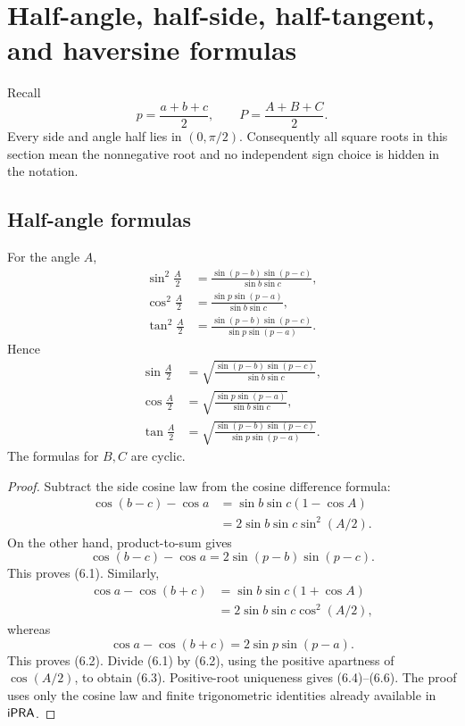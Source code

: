 \section{Half-angle, half-side, half-tangent, and haversine formulas}
\label{sec:half-formulas}

Recall
\[
 p=\frac{a+b+c}{2},\qquad P=\frac{A+B+C}{2}.
\]
Every side and angle half lies in \((0,\pi/2)\).  Consequently all square roots
in this section mean the nonnegative root and no independent sign choice is
hidden in the notation.

\subsection{Half-angle formulas}

\begin{theorem}
\label{thm:half-angle}
For the angle \(A\),
\begin{align}
 \sin^2\frac A2
 &=\frac{\sin(p-b)\sin(p-c)}{\sin b\sin c},                \tag{6.1}\\
 \cos^2\frac A2
 &=\frac{\sin p\sin(p-a)}{\sin b\sin c},                  \tag{6.2}\\
 \tan^2\frac A2
 &=\frac{\sin(p-b)\sin(p-c)}{\sin p\sin(p-a)}.            \tag{6.3}
\end{align}
Hence
\begin{align}
 \sin\frac A2
 &=\sqrt{\frac{\sin(p-b)\sin(p-c)}{\sin b\sin c}},        \tag{6.4}\\
 \cos\frac A2
 &=\sqrt{\frac{\sin p\sin(p-a)}{\sin b\sin c}},           \tag{6.5}\\
 \tan\frac A2
 &=\sqrt{\frac{\sin(p-b)\sin(p-c)}{\sin p\sin(p-a)}}.     \tag{6.6}
\end{align}
The formulas for \(B,C\) are cyclic.
\end{theorem}

\begin{proof}
Subtract the side cosine law from the cosine difference formula:
\begin{align*}
 \cos(b-c)-\cos a
 &=\sin b\sin c(1-\cos A)\\
 &=2\sin b\sin c\sin^2(A/2).
\end{align*}
On the other hand, product-to-sum gives
\[
 \cos(b-c)-\cos a=2\sin(p-b)\sin(p-c).
\]
This proves (6.1).  Similarly,
\begin{align*}
 \cos a-\cos(b+c)
 &=\sin b\sin c(1+\cos A)\\
 &=2\sin b\sin c\cos^2(A/2),
\end{align*}
whereas
\[
 \cos a-\cos(b+c)=2\sin p\sin(p-a).
\]
This proves (6.2).  Divide (6.1) by (6.2), using the positive apartness of
\(\cos(A/2)\), to obtain (6.3).  Positive-root uniqueness gives
(6.4)--(6.6).  The proof uses only the cosine law and finite trigonometric
identities already available in \(\mathsf{iPRA}\).
\end{proof}

